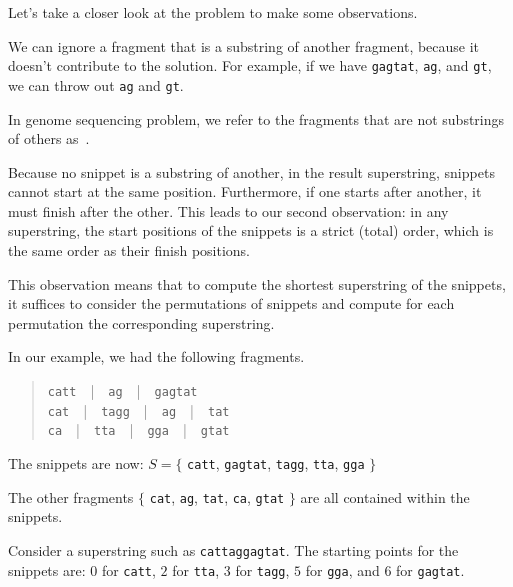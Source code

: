 \begin{gram}
Let's take a closer look at the problem to make some observations.
\end{gram}

\begin{gram}[Observation 1]
We can ignore a fragment that is a substring of another fragment,
because it doesn't contribute to the solution.
%
For example, if we have \texttt{gagtat}, \texttt{ag}, and \texttt{gt},
we can throw out \texttt{ag} and \texttt{gt}. 
\end{gram}

\begin{definition}[Snippets]
In genome sequencing problem, we refer to the fragments that are not
substrings of others as~.
\end{definition}

\begin{gram}
Because no snippet is a substring of another, in the result
superstring, snippets cannot start at the same position.
%
Furthermore, if one starts after another, it must finish after the
other.  
%
This leads to our second observation: in any superstring, the start
positions of the snippets is a strict (total) order, which is the same
order as their finish positions.
%

This observation means that to compute the shortest superstring of the
snippets, it suffices to consider the permutations of snippets and
compute for each permutation the corresponding superstring.
\end{gram}


\begin{example}
In our example, we had the following fragments.

\begin{quote}
\texttt{catt}~~|~~\texttt{ag}~~|~~\texttt{gagtat}
\\
\texttt{cat}~~|~~\texttt{tagg}~~|~~\texttt{ag}~~|~~\texttt{tat}
\\
\texttt{ca}~~|~~\texttt{tta}~~|~~\texttt{gga}~~|~~\texttt{gtat}
\end{quote}

The snippets are now:
$S = \{$
%
\texttt{catt}, \texttt{gagtat}, \texttt{tagg},  \texttt{tta}, \texttt{gga}
%
$\}$


The other fragments
%
$\{$
%
\texttt{cat}, \texttt{ag}, \texttt{tat},
\texttt{ca}, \texttt{gtat}
% 
$ \}$ are all contained within the snippets.

Consider a superstring such as \texttt{cattaggagtat}.  The starting
points for the snippets are: 
%
$0$ for \texttt{catt}, 
%
$2$ for \texttt{tta},
%
$3$ for \texttt{tagg},
%
$5$ for \texttt{gga}, and
%
$6$ for \texttt{gagtat}.
\end{example}

